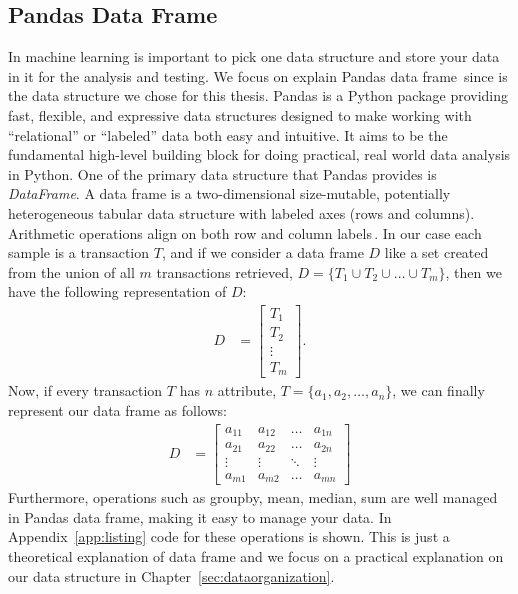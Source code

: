 \documentclass[USenglish]{uit-thesis}
\begin{document}
\subsection{Pandas Data Frame}
\label{sec:pandas}
In machine learning is important to
pick one data structure and store your data in it for
the analysis and testing. We focus on
explain Pandas data frame\,\cite{pandas}
since is the data structure we chose for this thesis.
Pandas is a Python package providing fast,
flexible, and expressive data structures designed
to make working with “relational” or “labeled” data
both easy and intuitive. It aims to be the fundamental
high-level building block for doing practical,
real world data analysis in Python.
One of the primary data structure that Pandas
provides is \emph{DataFrame}. A data frame is
a two-dimensional size-mutable, potentially
heterogeneous tabular data structure with
labeled axes (rows and columns). Arithmetic
operations align on both row and
column labels\,\cite{pandas}.
In our case each sample is a transaction $T$, and
if we consider a data frame $D$ like a set created
from the union
of all $m$ transactions retrieved, $D = \{ T_1 \cup T_2 \cup \dots \cup T_m\}$,
then we have the following representation of $D$:
\begin{align}
D &=\begin{bmatrix}
T_{1}\\
T_{2}\\
\vdots\\
T_{m}
\end{bmatrix}.
\end{align}
Now, if every transaction $T$ has $n$ attribute,
$T = \{a_1, a_2, \dots, a_n\}$,
we can finally represent our data frame as follows:
\begin{align}
\label{eq:dataframe}
D &=\begin{bmatrix}
a_{11} & a_{12} & \dots & a_{1n}\\
a_{21} & a_{22} & \dots & a_{2n}\\
\vdots & \vdots & \ddots & \vdots\\
a_{m1} & a_{m2} & \dots & a_{mn}
\end{bmatrix}
\end{align}
Furthermore, operations such as groupby, mean, median,
sum are well managed in Pandas data frame, making it easy
to manage your data. In Appendix~\ref{app:listing} code
for these operations is shown.
This is just a theoretical explanation of data frame and
we focus on a practical explanation on our data structure
in Chapter~\ref{sec:dataorganization}.
\end{document}
